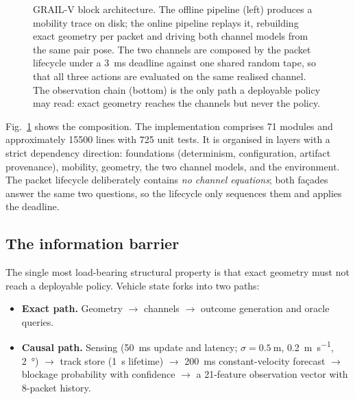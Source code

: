 \documentclass[conference]{IEEEtran}
\begin{document}
\begin{figure}[!t]
\caption{GRAIL-V block architecture. The offline pipeline (left) produces a
mobility trace on disk; the online pipeline replays it, rebuilding exact
geometry per packet and driving both channel models from the same pair pose.
The two channels are composed by the packet lifecycle under a
\SI{3}{\milli\second} deadline against one shared random tape, so that all
three actions are evaluated on the same realised channel. The observation
chain (bottom) is the only path a deployable policy may read: exact geometry
reaches the channels but never the policy.}
\label{fig:arch}
\end{figure}

Fig.~\ref{fig:arch} shows the composition. The implementation comprises 71
modules and approximately \num{15500} lines with \num{725} unit tests. It is
organised in layers with a strict dependency direction: foundations
(determinism, configuration, artifact provenance), mobility, geometry, the two
channel models, and the environment. The packet lifecycle deliberately
contains \emph{no channel equations}; both fa\c{c}ades answer the same two
questions, so the lifecycle only sequences them and applies the deadline.

\subsection{The information barrier}

The single most load-bearing structural property is that exact geometry must
not reach a deployable policy. Vehicle state forks into two paths:

\begin{itemize}
\item \textbf{Exact path.} Geometry $\rightarrow$ channels $\rightarrow$
outcome generation and oracle queries.
\item \textbf{Causal path.} Sensing (\SI{50}{\milli\second} update and
latency; $\sigma=\SI{0.5}{\meter}$, \SI{0.2}{\meter\per\second},
\SI{2}{\degree}) $\rightarrow$ track store (\SI{1}{\second} lifetime)
$\rightarrow$ \SI{200}{\milli\second} constant-velocity forecast $\rightarrow$
blockage probability with confidence $\rightarrow$ a 21-feature observation
vector with 8-packet history.
\end{itemize}
\end{document}
